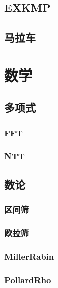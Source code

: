 \subsection{EXKMP}


\subsection{马拉车}


\section{数学}
\subsection{多项式}
\subsubsection{FFT}


\subsubsection{NTT}

\subsection{数论}
\subsubsection{区间筛}


\subsubsection{欧拉筛}


\subsubsection{MillerRabin}


\subsubsection{PollardRho}


